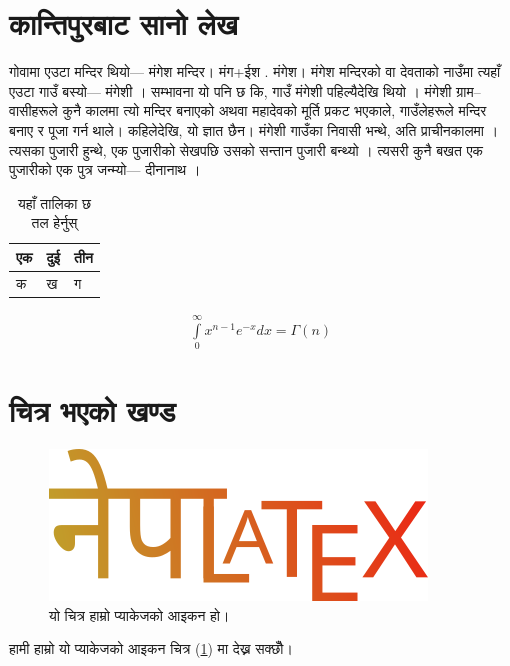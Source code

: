 \documentclass[a4paper]{article}
\begin{document}
    \section{कान्तिपुरबाट सानो लेख}
        गोवामा एउटा मन्दिर थियो— मंगेश मन्दिर। मंग+ईश . मंगेश। मंगेश मन्दिरको वा देवताको नाउँमा त्यहाँ एउटा गाउँ बस्यो— मंगेशी । सम्भावना यो पनि छ कि, गाउँ मंगेशी पहिल्यैदेखि थियो । मंगेशी ग्राम--वासीहरूले कुनै कालमा त्यो मन्दिर बनाएको अथवा महादेवको मूर्ति प्रकट भएकाले, गाउँलेहरूले मन्दिर बनाए र पूजा गर्न थाले। कहिलेदेखि, यो ज्ञात छैन। मंगेशी गाउँका निवासी भन्थे, अति प्राचीनकालमा । त्यसका पुजारी हुन्थे, एक पुजारीको सेखपछि उसको सन्तान पुजारी बन्थ्यो । त्यसरी कुनै बखत एक पुजारीको एक पुत्र जन्म्यो— दीनानाथ ।

        \begin{table}[h!]
            \centering
            \caption{यहाँ तालिका छ तल हेर्नुस्}
            \begin{tabular}{lll}
                एक & दुई & तीन \\
                \hline \hline
                क & ख & ग\\
                \hline
            \end{tabular}
        \end{table}
    
        \begin{align}
            \int\limits_0^\infty x^{n-1} e^{-x} dx = \Gamma(n)
        \end{align}
    \section{चित्र भएको खण्ड}

        \begin{figure}[h!]
            \centering
            \includegraphics[width=.60\linewidth]{../images/logo.png}
            \caption{यो चित्र हाम्रो प्याकेजको आइकन हो।}
            \label{fig:pkg-icn}
        \end{figure}
        हामी हाम्रो यो प्याकेजको आइकन चित्र (\ref{fig:pkg-icn}) मा देख्न सक्छौँ।
\end{document}
